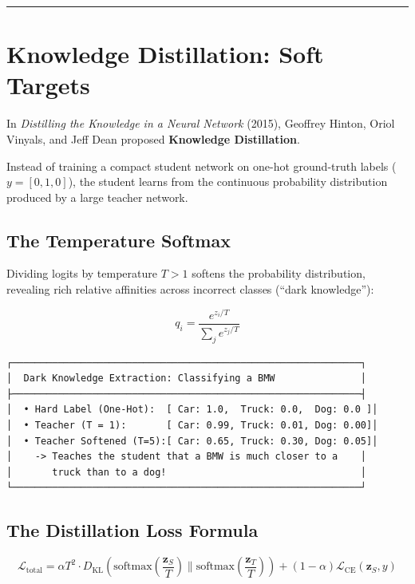 \documentclass[
  letterpaper,
]{scrbook}
\begin{document}
\begin{center}\rule{0.5\linewidth}{0.5pt}\end{center}

\section{Knowledge Distillation: Soft
Targets}\label{knowledge-distillation-soft-targets}

In \emph{Distilling the Knowledge in a Neural Network} (2015), Geoffrey
Hinton, Oriol Vinyals, and Jeff Dean proposed \textbf{Knowledge
Distillation}.

Instead of training a compact student network on one-hot ground-truth
labels (\(y = [0, 1, 0]\)), the student learns from the continuous
probability distribution produced by a large teacher network.

\subsection{The Temperature Softmax}\label{the-temperature-softmax}

Dividing logits by temperature \(T > 1\) softens the probability
distribution, revealing rich relative affinities across incorrect
classes (``dark knowledge''):

\[q_i = \frac{e^{z_i / T}}{\sum_j e^{z_j / T}}\]

\begin{verbatim}
┌─────────────────────────────────────────────────────────────┐
│  Dark Knowledge Extraction: Classifying a BMW               │
├─────────────────────────────────────────────────────────────┤
│  • Hard Label (One-Hot):  [ Car: 1.0,  Truck: 0.0,  Dog: 0.0 ]│
│  • Teacher (T = 1):       [ Car: 0.99, Truck: 0.01, Dog: 0.00]│
│  • Teacher Softened (T=5):[ Car: 0.65, Truck: 0.30, Dog: 0.05]│
│    -> Teaches the student that a BMW is much closer to a    │
│       truck than to a dog!                                  │
└─────────────────────────────────────────────────────────────┘
\end{verbatim}

\subsection{The Distillation Loss
Formula}\label{the-distillation-loss-formula}

\[\mathcal{L}_{\text{total}} = \alpha T^2 \cdot D_{\text{KL}}\left(\text{softmax}\left(\frac{\mathbf{z}_S}{T}\right) \parallel \text{softmax}\left(\frac{\mathbf{z}_T}{T}\right)\right) + (1 - \alpha) \mathcal{L}_{\text{CE}}(\mathbf{z}_S, y)\]
\end{document}
